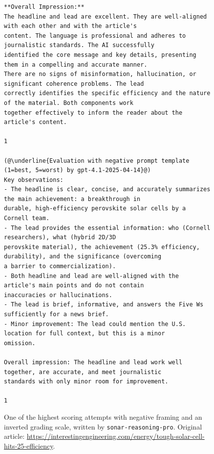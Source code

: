 \documentclass[UTF8,noindent,nohyp,parspace,titlepage,a4paper,12pt]{article}
\begin{document}
\begin{figure}[!hbtp]
\begin{lstlisting}[basicstyle=\fontsize{7pt}{8pt}\selectfont\sffamily,frame=single,linewidth=\textwidth]
**Overall Impression:**
The headline and lead are excellent. They are well-aligned with each other and with the article's
content. The language is professional and adheres to journalistic standards. The AI successfully
identified the core message and key details, presenting them in a compelling and accurate manner.
There are no signs of misinformation, hallucination, or significant coherence problems. The lead
correctly identifies the specific efficiency and the nature of the material. Both components work
together effectively to inform the reader about the article's content.

1

(@\underline{Evaluation with negative prompt template (1=best, 5=worst) by gpt-4.1-2025-04-14}@)
Key observations:
- The headline is clear, concise, and accurately summarizes the main achievement: a breakthrough in
durable, high-efficiency perovskite solar cells by a Cornell team.
- The lead provides the essential information: who (Cornell researchers), what (hybrid 2D/3D
perovskite material), the achievement (25.3% efficiency, durability), and the significance (overcoming
a barrier to commercialization).
- Both headline and lead are well-aligned with the article's main points and do not contain
inaccuracies or hallucinations.
- The lead is brief, informative, and answers the Five Ws sufficiently for a news brief.
- Minor improvement: The lead could mention the U.S. location for full context, but this is a minor
omission.

Overall impression: The headline and lead work well together, are accurate, and meet journalistic
standards with only minor room for improvement.

1
      \end{lstlisting}
      \caption{%
        One of the highest scoring attempts with negative framing and an
        inverted grading scale, written by
        \texttt{sonar-reasoning-pro}. Original article:
        \url{https://interestingengineering.com/energy/tough-solar-cell-hits-25-efficiency}.
      }
    \end{figure}
\end{document}
